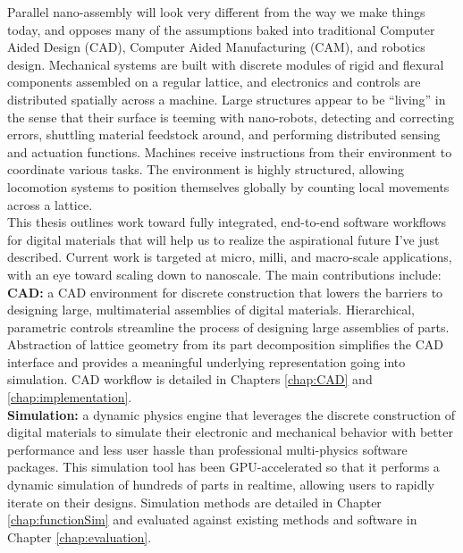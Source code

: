 {Parallel nano-assembly will look very different from the way we make things today, and opposes many of the assumptions baked into traditional Computer Aided Design (CAD),  Computer Aided Manufacturing (CAM), and robotics design.  Mechanical systems are built with discrete modules of rigid and flexural components assembled on a regular lattice, and electronics and controls are distributed spatially across a machine.  Large structures appear to be ``living'' in the sense that their surface is teeming with nano-robots, detecting and correcting errors, shuttling material feedstock around, and performing distributed sensing and actuation functions.  Machines receive instructions from their environment to coordinate various tasks.  The environment is highly structured, allowing locomotion systems to position themselves globally by counting local movements across a lattice.  %
\\

This thesis outlines work toward fully integrated, end-to-end software workflows for digital materials that will help us to realize the aspirational future I've just described.  Current work is targeted at micro, milli, and macro-scale applications, with an eye toward scaling down to nanoscale.  The main contributions include:\\

\textbf{CAD:} a CAD environment for discrete construction that lowers the barriers to designing large, multimaterial assemblies of digital materials.  Hierarchical, parametric controls streamline the process of designing large assemblies of parts.   Abstraction of lattice geometry from its part decomposition simplifies the CAD interface and provides a meaningful underlying representation going into simulation.  CAD workflow is detailed in Chapters \ref{chap:CAD} and \ref{chap:implementation}.\\

\textbf{Simulation:} a dynamic physics engine that leverages the discrete construction of digital materials to simulate their electronic and mechanical behavior with better performance and less user hassle than professional multi-physics software packages.  This simulation tool has been GPU-accelerated so that it performs a dynamic simulation of hundreds of parts in realtime, allowing users to rapidly iterate on their designs.  Simulation methods are detailed in Chapter \ref{chap:functionSim} and evaluated against existing methods and software in Chapter \ref{chap:evaluation}.\\

}
